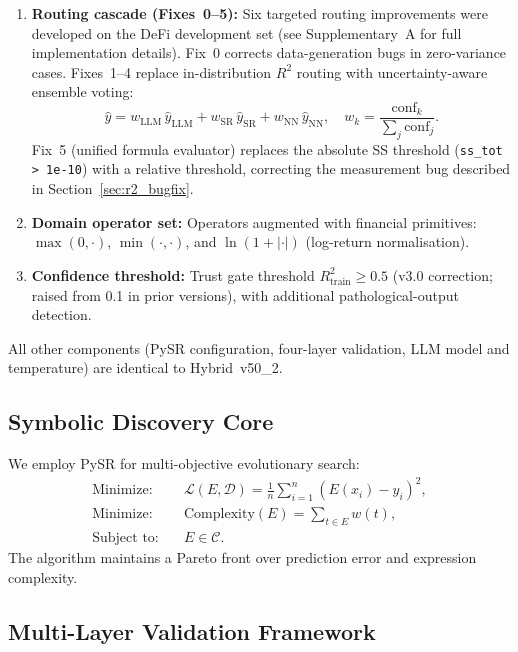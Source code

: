 \documentclass[twoside,11pt]{article}
\begin{document}
\begin{enumerate}
\item \textbf{Routing cascade (Fixes~0--5):} Six targeted routing improvements
  were developed on the DeFi development set (see Supplementary~A for full
  implementation details).  Fix~0 corrects data-generation bugs in zero-variance
  cases.  Fixes~1--4 replace in-distribution $R^2$ routing with uncertainty-aware
  ensemble voting:
  \[
    \hat{y} = w_\mathrm{LLM}\,\hat{y}_\mathrm{LLM}
             + w_\mathrm{SR}\,\hat{y}_\mathrm{SR}
             + w_\mathrm{NN}\,\hat{y}_\mathrm{NN},
    \quad w_k = \frac{\mathrm{conf}_k}{\sum_j \mathrm{conf}_j}.
  \]
  Fix~5 (unified formula evaluator) replaces the absolute SS threshold
  (\texttt{ss\_tot > 1e-10}) with a relative threshold, correcting the
  measurement bug described in Section~\ref{sec:r2_bugfix}.
\item \textbf{Domain operator set:} Operators augmented with financial
  primitives: $\max(0,\cdot)$, $\min(\cdot,\cdot)$, and
  $\ln(1+|\cdot|)$ (log-return normalisation).
\item \textbf{Confidence threshold:} Trust gate threshold $R^2_{\mathrm{train}} \geq 0.5$
  (v3.0 correction; raised from 0.1 in prior versions), with additional
  pathological-output detection.
\end{enumerate}

All other components (PySR configuration, four-layer validation, LLM model and
temperature) are identical to Hybrid~v50\_2.

\subsection{Symbolic Discovery Core}\label{subsec:symbolic-discovery-core}
\label{sec:arch_discovery}

We employ PySR \citep{cranmer2023pysr} for multi-objective evolutionary search:
\begin{align}
\text{Minimize:} \quad
& \mathcal{L}(E,\mathcal{D})
  = \frac{1}{n}\sum_{i=1}^n (E(x_i) - y_i)^2, \label{eq:loss}\\
\text{Minimize:} \quad
& \mathrm{Complexity}(E) = \sum_{t \in E} w(t), \label{eq:complexity}\\
\text{Subject to:} \quad
& E \in \mathcal{C}. \label{eq:constraints}
\end{align}
The algorithm maintains a Pareto front over prediction error and expression
complexity.

\subsection{Multi-Layer Validation Framework}\label{subsec:multilayer-validation-framework}
\label{sec:validation_detail}
\end{document}
